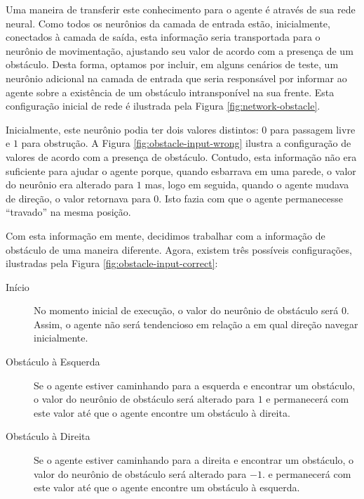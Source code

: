 
Uma maneira de transferir este conhecimento para o agente é através de sua rede
neural. Como todos os neurônios da camada de entrada estão, inicialmente,
conectados à camada de saída, esta informação seria transportada para o neurônio
de movimentação, ajustando seu valor de acordo com a presença de um obstáculo.
Desta forma, optamos por incluir, em alguns cenários de teste, um neurônio
adicional na camada de entrada que seria responsável por informar ao agente
sobre a existência de um obstáculo intransponível na sua frente. Esta
configuração inicial de rede é ilustrada pela Figura \ref{fig:network-obstacle}.


Inicialmente, este neurônio podia ter dois valores distintos: $0$ para passagem
livre e $1$ para obstrução. A Figura \ref{fig:obstacle-input-wrong} ilustra a
configuração de valores de acordo com a presença de obstáculo. Contudo, esta
informação não era suficiente para ajudar o agente porque, quando esbarrava em
uma parede, o valor do neurônio era alterado para $1$ mas, logo em seguida,
quando o agente mudava de direção, o valor retornava para $0$. Isto fazia com
que o agente permanecesse ``travado'' na mesma posição.


Com esta informação em mente, decidimos trabalhar com a informação de obstáculo
de uma maneira diferente. Agora, existem três possíveis configurações,
ilustradas pela Figura \ref{fig:obstacle-input-correct}:

\begin{description}
	\item[Início]
		No momento inicial de execução, o valor do neurônio de obstáculo será
		$0$. Assim, o agente não será tendencioso em relação a em qual direção
		navegar inicialmente.

	\item[Obstáculo à Esquerda]
		Se o agente estiver caminhando para a esquerda e encontrar um obstáculo,
		o valor do neurônio de obstáculo será alterado para $1$ e permanecerá
		com este valor até que o agente encontre um obstáculo à direita.

	\item[Obstáculo à Direita]
		Se o agente estiver caminhando para a direita e encontrar um obstáculo,
		o valor do neurônio de obstáculo será alterado para $-1$. e permanecerá
		com este valor até que o agente encontre um obstáculo à esquerda.
\end{description}

